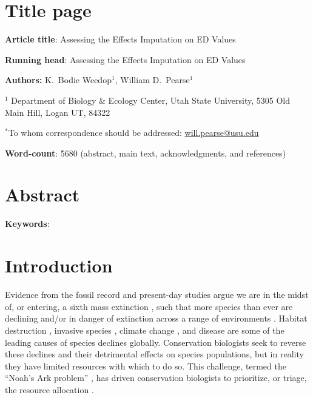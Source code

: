 \documentclass[12pt,english]{article}
\begin{document}
\setlength{\parindent}{0pt}
\section*{Title page}

\textbf{Article title}: Assessing the Effects Imputation on ED Values

\textbf{Running head}: Assessing the Effects Imputation on ED Values

\textbf{Authors:} K.\ Bodie Weedop$^{1}$, William D.\ Pearse$^{1}$\

$^1$ Department of Biology \& Ecology Center, Utah State University,
5305 Old Main Hill, Logan UT, 84322

$^*$To whom correspondence should be addressed:
\url{will.pearse@usu.edu}

\textbf{Word-count}: 5680 (abstract, main text, acknowledgments, and
  references)

\clearpage
\section*{Abstract}


\textbf{Keywords}: 

\clearpage
\section*{Introduction}



Evidence from the fossil record and present-day studies argue we are
in the midst of, or entering, a sixth mass extinction
\autocite{Barnosky2011, Ceballos2015}, such that more species than
ever are declining and/or in danger of extinction across a range of
environments \autocite{Wake2008,Thomas2004}. Habitat destruction
\autocite{Brooks2002}, invasive species \autocite{Molnar2008}, climate
change \autocite{Pounds2006}, and disease \autocite{Lips2006} are some
of the leading causes of species declines globally. Conservation
biologists seek to reverse these declines and their detrimental
effects on species populations, but in reality they have limited
resources with which to do so. This challenge, termed the ``Noah's Ark
problem'' \autocite{Weitzman1998}, has driven conservation biologists
to prioritize, or triage, the resource allocation
\autocite{Bottrill2008}.
\end{document}
